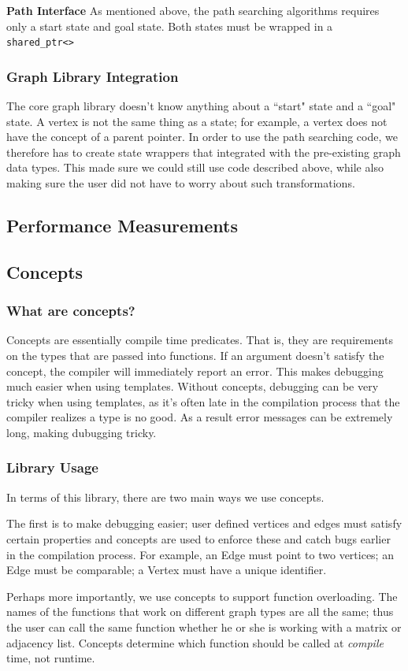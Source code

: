 \documentclass{article}
\begin{document}
\textbf{Path Interface}
As mentioned above, the path searching algorithms requires only a start state and goal state. Both states must be wrapped in a \texttt{shared\_ptr<>}

\subsubsection{Graph Library Integration}
The core graph library doesn't know anything about a ``start" state and a ``goal" state. A vertex is not the same thing as a state; for example, a vertex does not have the concept of a parent pointer. In order to use the path searching code, we therefore has to create state wrappers that integrated with the pre-existing graph data types. This made sure we could still use code described above, while also making sure the user did not have to worry about such transformations.

\subsection{Performance Measurements}

\subsection{Concepts}
\subsubsection{What are concepts?}
Concepts are essentially compile time predicates. That is, they are requirements on the types that are passed into functions. If an argument doesn't satisfy the concept, the compiler will immediately report an error. This makes debugging much easier when using templates. Without concepts, debugging can be very tricky when using templates, as it's often late in the compilation process that the compiler realizes a type is no good. As a result error messages can be extremely long, making dubugging tricky. 
\subsubsection{Library Usage}
In terms of this library, there are two main ways we use concepts.
\par
The first is to make debugging easier; user defined vertices and edges must satisfy certain properties and concepts are used to enforce these and catch bugs earlier in the compilation process. For example, an Edge must point to two vertices; an Edge must be comparable; a Vertex must have a unique identifier. 
\par
Perhaps more importantly, we use concepts to support function overloading. The names of the functions that work on different graph types are all the same; thus the user can call the same function whether he or she is working with a matrix or adjacency list. Concepts determine which function should be called at \emph{compile} time, not runtime. 
\end{document}
